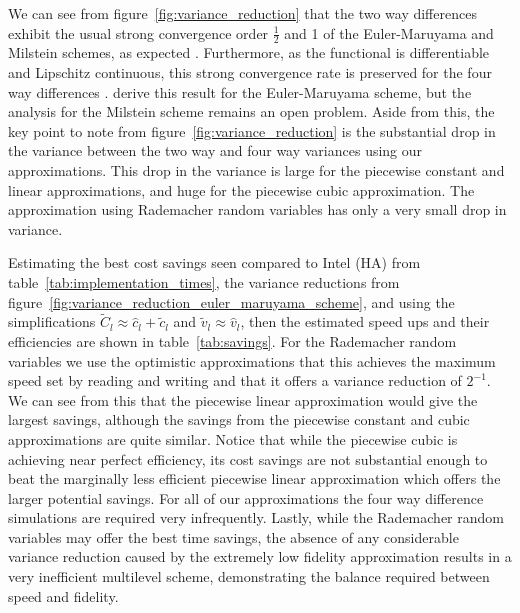 \documentclass[9pt,a4paper,english]{extarticle}
\begin{document}
We can see from figure~\ref{fig:variance_reduction} that the two way differences exhibit the usual strong convergence order $ \tfrac{1}{2} $ and 1 of the Euler-Maruyama and Milstein schemes, as expected \citep{kloeden1999numerical}. Furthermore, as the functional is differentiable and Lipschitz continuous, this strong convergence rate is preserved for the four way differences \citep{giles2020approximate,sheridan2020nested}. \citeauthor{giles2020approximate} \citep{giles2020approximate,sheridan2020nested} derive this result for the Euler-Maruyama scheme, but the analysis for the Milstein scheme remains an open problem. Aside from this, the key point to note from figure~\ref{fig:variance_reduction} is the substantial drop in the variance between the two way and four way variances using our approximations. This drop in the variance is large for the piecewise constant and linear approximations, and huge for the piecewise cubic approximation. The approximation using Rademacher random variables has only a very small drop in variance. 

Estimating the best cost savings seen compared to Intel (HA) from table~\ref{tab:implementation_times}, the variance reductions from figure~\ref{fig:variance_reduction_euler_maruyama_scheme}, and using the simplifications $ \widetilde{C}_l \approx \hat{c}_l + \tilde{c}_l $ and $ \tilde{v}_l \approx  \hat{v}_l $, then the estimated speed ups and their efficiencies are shown in table~\ref{tab:savings}. For the Rademacher random variables we use the optimistic  approximations that this achieves the maximum speed set by reading and writing and that it offers a variance reduction of $ 2^{-1} $. We can see from this that the piecewise linear approximation would give the largest savings, although the savings from the piecewise constant and cubic approximations are quite similar. Notice that while the piecewise cubic is achieving near perfect efficiency, its cost savings are not substantial enough to beat the marginally less efficient piecewise linear approximation which offers the larger potential savings. For all of our approximations the four way difference simulations are required very infrequently. Lastly, while the Rademacher random variables may offer the best time savings, the absence of any considerable variance reduction caused by the extremely low fidelity approximation results in a very inefficient multilevel scheme, demonstrating the balance required between speed and fidelity. 
\end{document}
